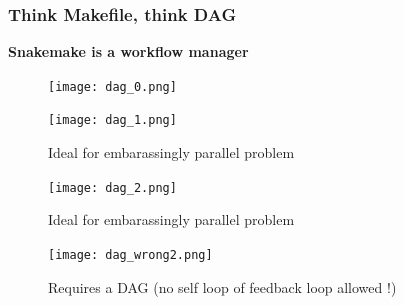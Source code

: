 \documentclass{beamer}
\begin{document}
\begin{frame}
\frametitle{Think Makefile, think DAG}
    
   \centering \textbf{Snakemake is a workflow manager}\\
      
        {
            \begin{figure}
                \texttt{[image: dag\_0.png]}
                \caption[1]{}
            \end{figure}                
        }
        {
            \begin{figure}
                \texttt{[image: dag\_1.png]}
                \caption[1]{Ideal for embarassingly parallel problem}
            \end{figure}                
        } 
        {
            \begin{figure}
                \texttt{[image: dag\_2.png]}
                \caption[1]{Ideal for embarassingly parallel problem}
            \end{figure}                
        }
        {
            \begin{figure}
                \texttt{[image: dag\_wrong2.png]}
                \caption[2]{Requires a DAG (no self loop of feedback loop allowed !)}
            \end{figure}
        }
\end{frame}
\end{document}
